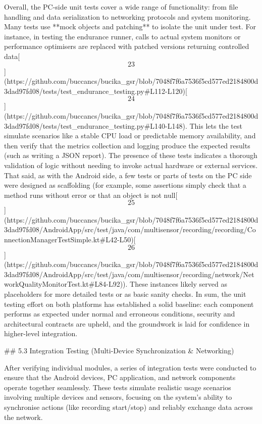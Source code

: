 \documentclass[12pt,a4paper]{article}
\begin{document}
{Overall, the PC-side unit tests cover a wide range of functionality:
from file handling and data serialization to networking protocols and
system monitoring. Many tests use **mock objects and patching** to
isolate the unit under test. For instance, in testing the endurance
runner, calls to actual system monitors or performance optimisers are
replaced with patched versions returning controlled
data[\[23\]](https://github.com/buccancs/bucika_gsr/blob/7048f7f6a7536f5cd577ed2184800d3dad97fd08/tests/test_endurance_testing.py#L112-L120)[\[24\]](https://github.com/buccancs/bucika_gsr/blob/7048f7f6a7536f5cd577ed2184800d3dad97fd08/tests/test_endurance_testing.py#L140-L148).
This lets the test simulate scenarios like a stable CPU load or
predictable memory availability, and then verify that the metrics
collection and logging produce the expected results (such as writing a
JSON report). The presence of these tests indicates a thorough
validation of logic without needing to invoke actual hardware or
external services. That said, as with the Android side, a few tests or
parts of tests on the PC side were designed as scaffolding (for example,
some assertions simply check that a method runs without error or that an
object is not
null[\[25\]](https://github.com/buccancs/bucika_gsr/blob/7048f7f6a7536f5cd577ed2184800d3dad97fd08/AndroidApp/src/test/java/com/multisensor/recording/recording/ConnectionManagerTestSimple.kt#L42-L50)[\[26\]](https://github.com/buccancs/bucika_gsr/blob/7048f7f6a7536f5cd577ed2184800d3dad97fd08/AndroidApp/src/test/java/com/multisensor/recording/network/NetworkQualityMonitorTest.kt#L84-L92)).
These instances likely served as placeholders for more detailed tests or
as basic sanity checks. In sum, the unit testing effort on both
platforms has established a solid baseline: each component performs as
expected under normal and erroneous conditions, security and
architectural contracts are upheld, and the groundwork is laid for
confidence in higher-level integration.

## 5.3 Integration Testing (Multi-Device Synchronization & Networking)

After verifying individual modules, a series of integration tests were
conducted to ensure that the Android devices, PC application, and
network components operate together seamlessly. These tests simulate
realistic usage scenarios involving multiple devices and sensors,
focusing on the system's ability to synchronise actions (like recording
start/stop) and reliably exchange data across the network.

}
\end{document}
